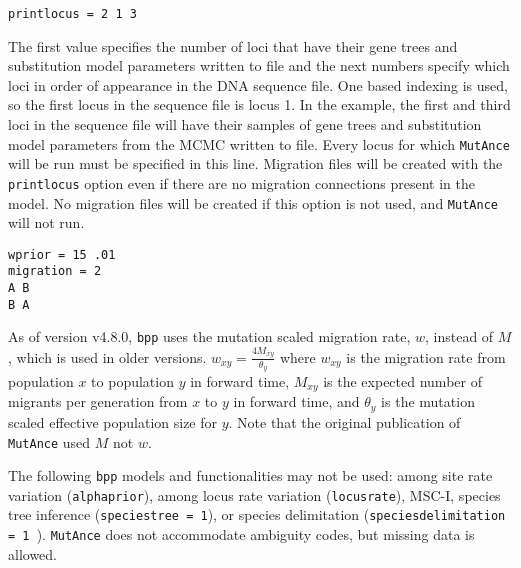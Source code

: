 \documentclass[11pt]{article}
\begin{document}
\begin{Verbatim}[frame=single, fontsize=\small]
printlocus = 2 1 3 
\end{Verbatim}
The first value specifies the number of loci that  have their gene trees and substitution model parameters written to file and the next numbers specify which loci in order of appearance in the DNA sequence file. 
One based indexing is used, so the first locus in the sequence file is locus 1.
In the example, the first and third loci in the sequence file will have their samples of gene trees and substitution model parameters from the MCMC written to file. 
Every locus for which \texttt{MutAnce} will be run must be specified in this line.
Migration files will be created with the \texttt{printlocus} option even if there are no migration connections present in the model.
No migration files will be created if this option is not used, and \texttt{MutAnce} will not run.

\begin{Verbatim}[frame=single, fontsize=\small]
wprior = 15 .01
migration = 2
A B
B A
\end{Verbatim}
As of version v4.8.0, \texttt{bpp} uses the mutation scaled migration rate, $w$, instead of $M$, which is used in older versions.
$w_{xy} = \frac{4 M_{xy}}{\theta_y} $ where $w_{xy}$ is the migration rate from population $x$ to population $y$ in forward time, $M_{xy}$ is the expected number of migrants per generation from $x$ to $y$ in forward time, and $\theta_y$ is the mutation scaled effective population size for $y$. Note that the original publication of \texttt{MutAnce} used $M$ not $w$.  

The following \texttt{bpp} models and functionalities may not be used: among site rate variation (\texttt{alphaprior}), among locus rate variation (\texttt{locusrate}), MSC-I,  
species tree inference (\texttt{speciestree = 1}), or species delimitation (\texttt{speciesdelimitation = 1 }).
\texttt{MutAnce} does not accommodate ambiguity codes, but missing data is allowed.
\end{document}
